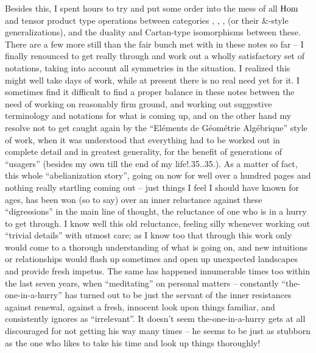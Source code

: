 Besides this, I spent hours to try and put some order into
the mess of all $\operatorname{Hom}$ and tensor product type operations between
categories \Ahatk, \AhatM, \Bhatk, \BhatM{} (or their $\&$-style
generalizations), and the duality and Cartan-type isomorphisms between
these. There are a few more still than the fair bunch met with in
these notes so far -- I finally renounced to get really through and
work out a wholly satisfactory set of notations, taking into account
all symmetries in the situation. I realized this might well take days
of work, while at present there is no real need yet for it. I
sometimes find it difficult to find a proper balance in these notes
between the need of working on reasonably firm ground, and working out
suggestive terminology and notations for what is coming up, and on the
other hand my resolve not to get caught again by the ``Eléments de
Géométrie Algébrique'' style of work, when it was understood that
everything had to be worked out in complete detail and in greatest
generality, for the benefit of generations of
``usagers'' (besides my own till the end of my
life!\kern.35\font.\kern.35\font.). As a matter
of fact, this whole ``abelianization story'', going on now for well
over a hundred pages and nothing really startling coming out -- just
things I feel I should have known for ages, has been won (so to say)
over an inner reluctance against these ``digressions'' in the main
line of thought, the reluctance of one who is in a hurry to get
through. I know well this old reluctance, feeling silly whenever
working out ``trivial details'' with utmost care; as I know too that
through this work only would come to a thorough understanding of what
is going on, and new intuitions or relationships would flash up
sometimes and open up unexpected landscapes and provide fresh
impetus. The same has happened innumerable times too within the last
seven years, when ``meditating'' on personal matters -- constantly
``the-one-in-a-hurry'' has turned out to be just the servant of the
inner resistances against renewal, against a fresh, innocent look upon
things familiar, and consistently ignores as ``irrelevant''. It
doesn't seem the-one-in-a-hurry gets at all discouraged for not
getting his way many times -- he seems to be just as stubborn as the
one who likes to take his time and look up things thoroughly!

\bigbreak

\noindent\hfill{}\par

